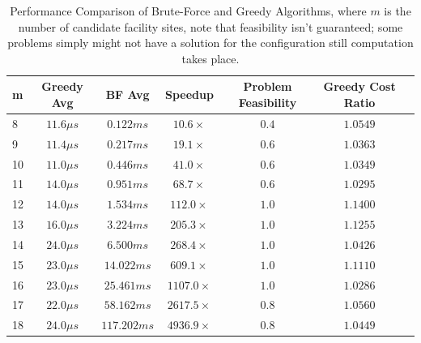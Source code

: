 \documentclass[letterpaper]{article}
\begin{document}
\begin{table}[H]
    \centering
    \renewcommand{\arraystretch}{1.3} %
    \begin{tabular}{l c c c c c c}
        \toprule
        \textbf{m} & \textbf{Greedy Avg} & \textbf{BF Avg} & \textbf{Speedup} & \textbf{Problem Feasibility} & \textbf{Greedy Cost Ratio} \\
        \midrule
        8  & $11.6 \mu s$ & $0.122 ms$   & $10.6\times$    & $0.4$ & $1.0549$ \\
        9  & $11.4 \mu s$ & $0.217 ms$   & $19.1\times$    & $0.6$ & $1.0363$ \\
        10 & $11.0 \mu s$ & $0.446 ms$   & $41.0\times$    & $0.6$ & $1.0349$ \\
        11 & $14.0 \mu s$ & $0.951 ms$   & $68.7\times$    & $0.6$ & $1.0295$ \\
        12 & $14.0 \mu s$ & $1.534 ms$   & $112.0\times$   & $1.0$ & $1.1400$ \\
        13 & $16.0 \mu s$ & $3.224 ms$   & $205.3\times$   & $1.0$ & $1.1255$ \\
        14 & $24.0 \mu s$ & $6.500 ms$   & $268.4\times$   & $1.0$ & $1.0426$ \\
        15 & $23.0 \mu s$ & $14.022 ms$  & $609.1\times$   & $1.0$ & $1.1110$ \\
        16 & $23.0 \mu s$ & $25.461 ms$  & $1107.0\times$  & $1.0$ & $1.0286$ \\
        17 & $22.0 \mu s$ & $58.162 ms$  & $2617.5\times$  & $0.8$ & $1.0560$ \\
        18 & $24.0 \mu s$ & $117.202 ms$ & $4936.9\times$  & $0.8$ & $1.0449$ \\
        \bottomrule
    \end{tabular}
    \caption{Performance Comparison of Brute-Force and Greedy Algorithms, where $m$ is the number of candidate facility sites, note that feasibility isn't guaranteed; some problems simply might not have a solution for the configuration still computation takes place.}
    \label{tab:performance}
\end{table}
\end{document}
